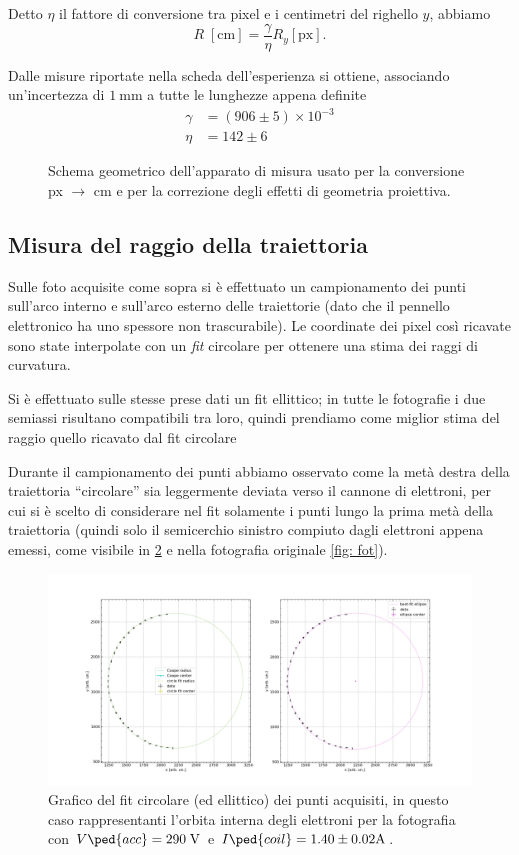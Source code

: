 \documentclass[10pt, a4paper, italian]{article}
\begin{document}
Detto $\eta$ il fattore di conversione tra pixel e i centimetri del righello
$y$, abbiamo
\[
R \; [\si{\centi\meter}] = \frac{\gamma}{\eta} R_y [\mathrm{px}]
.\]

Dalle misure riportate nella scheda dell'esperienza si ottiene, associando
un'incertezza di $\SI{1}{\milli\meter}$ a tutte le lunghezze appena definite
\begin{align*}
\gamma &= (906 \pm 5) \times 10^{-3} \\ 
\eta &= 142 \pm 6
\end{align*}

\begin{figure}[htbp]
    \centering
    
    \caption{\label{fig: conversione} Schema geometrico dell'apparato di
    misura usato per la conversione px $\to$ cm e per la correzione
    degli effetti di geometria proiettiva.}
\end{figure}

\subsection{Misura del raggio della traiettoria}
Sulle foto acquisite come sopra si è effettuato un campionamento dei punti
sull'arco interno e sull'arco esterno delle traiettorie (dato che il pennello
elettronico ha uno spessore non trascurabile). Le coordinate dei pixel così
ricavate sono state interpolate con un \emph{fit} circolare per ottenere una
stima dei raggi di curvatura.

Si è effettuato sulle stesse prese dati un fit ellittico; in tutte le
fotografie i due semiassi risultano compatibili tra loro, quindi
prendiamo come miglior stima del raggio quello ricavato dal fit circolare

Durante il campionamento dei punti abbiamo osservato come la metà destra
della traiettoria ``circolare'' sia leggermente deviata verso il cannone
di elettroni, per cui si è scelto di considerare nel fit solamente i punti
lungo la prima metà della traiettoria (quindi solo il semicerchio sinistro
compiuto dagli elettroni appena emessi, come visibile in \cref{fig: circfit}
e nella fotografia originale \cref{fig: fot}).
\begin{figure}[htbp]
\includegraphics[width=\textwidth]{circfit}
\caption{Grafico del fit circolare (ed ellittico) dei punti acquisiti, in
questo caso rappresentanti l'orbita interna degli elettroni per la fotografia
con $V\ped{acc} = 290 \; \si{V}$ e $I\ped{coil} = 1.40 \pm 0.02 \si{A}$.
\label{fig: circfit}}
\end{figure}
\end{document}
